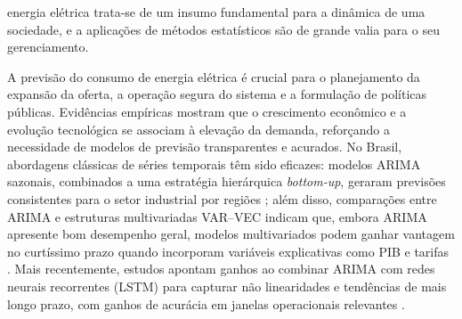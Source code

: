 \documentclass[journal]{IEEEtran}
\begin{document}






 energia elétrica trata-se de um insumo fundamental para a dinâmica de uma sociedade, e a aplicações de métodos estatísticos são de grande valia para o seu gerenciamento\cite{marcos2021}. 

A previsão do consumo de energia elétrica é crucial para o planejamento da expansão da oferta, a operação segura do sistema e a formulação de políticas públicas. Evidências empíricas mostram que o crescimento econômico e a evolução tecnológica se associam à elevação da demanda, reforçando a necessidade de modelos de previsão transparentes e acurados. No Brasil, abordagens clássicas de séries temporais têm sido eficazes: modelos ARIMA sazonais, combinados a uma estratégia hierárquica \textit{bottom-up}, geraram previsões consistentes para o setor industrial por regiões \cite{filho2025}; além disso, comparações entre ARIMA e estruturas multivariadas VAR--VEC indicam que, embora ARIMA apresente bom desempenho geral, modelos multivariados podem ganhar vantagem no curtíssimo prazo quando incorporam variáveis explicativas como PIB e tarifas \cite{nunes2022}. Mais recentemente, estudos apontam ganhos ao combinar ARIMA com redes neurais recorrentes (LSTM) para capturar não linearidades e tendências de mais longo prazo, com ganhos de acurácia em janelas operacionais relevantes \cite{goncalves2025}.
\end{document}
